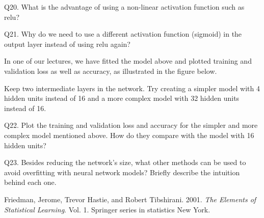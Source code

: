 \documentclass[]{article}
\begin{document}
Q20. What is the advantage of using a non-linear activation function
such as relu?

Q21. Why do we need to use a different activation function (sigmoid) in
the output layer instead of using relu again?

In one of our lectures, we have fitted the model above and plotted
training and validation loss as well as accuracy, as illustrated in the
figure below.

Keep two intermediate layers in the network. Try creating a simpler
model with 4 hidden units instead of 16 and a more complex model with 32
hidden units instead of 16.

Q22. Plot the training and validation loss and accuracy for the simpler
and more complex model mentioned above. How do they compare with the
model with 16 hidden units?

Q23. Besides reducing the network's size, what other methods can be used
to avoid overfitting with neural network models? Briefly describe the
intuition behind each one.

\hypertarget{refs}{}
\hypertarget{ref-ESL}{}
Friedman, Jerome, Trevor Hastie, and Robert Tibshirani. 2001. \emph{The
Elements of Statistical Learning}. Vol. 1. Springer series in statistics
New York.
\end{document}
